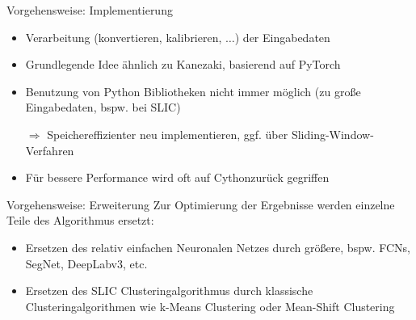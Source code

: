 \documentclass[9pt]{beamer}
\begin{document}
\begin{frame}{Vorgehensweise: Implementierung}
\begin{itemize}
	\item Verarbeitung (konvertieren, kalibrieren, $\ldots$) der Eingabedaten
	\item Grundlegende Idee ähnlich zu Kanezaki, basierend auf PyTorch
	\item Benutzung von Python Bibliotheken nicht immer möglich (zu große Eingabedaten, bspw. bei SLIC)
	\item[$\Rightarrow$] Speichereffizienter neu implementieren, ggf. über Sliding-Window-Verfahren
	\item Für bessere Performance wird oft auf Cython\footnotemark[1] zurück gegriffen
\end{itemize}
\end{frame}

\begin{frame}{Vorgehensweise: Erweiterung}
Zur Optimierung der Ergebnisse werden einzelne Teile des Algorithmus ersetzt:
\begin{itemize}
	\item Ersetzen des relativ einfachen Neuronalen Netzes durch größere, bspw. FCNs, SegNet\footnotemark[1], DeepLabv3\footnotemark[1], etc.
	\item Ersetzen des SLIC Clusteringalgorithmus durch klassische Clusteringalgorithmen wie k-Means Clustering oder Mean-Shift Clustering
\end{itemize}
\end{frame}
\end{document}
